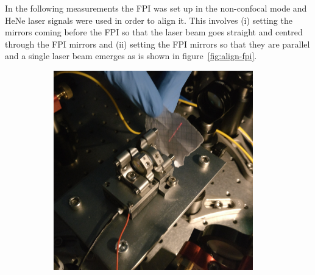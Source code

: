 In the following measurements the \ac{FPI} was set up in the non-confocal mode and HeNe laser signals were used in order to align it.
This involves (i) setting the mirrors coming before the \ac{FPI} so that the laser beam goes straight and centred through the \ac{FPI} mirrors and (ii) setting the \ac{FPI} mirrors so that they are parallel and a single laser beam emerges as is shown in figure~\ref{fig:align-fpi}.


\begin{figure}[H]
	\centering
	\begin{subfigure}[b]{0.48\textwidth}
		\centering
		\includegraphics[width=0.95\textwidth]{figures/fabry-perot/setup/confocal-setup-higher-modes-1}
		\caption{}
		\label{fig:confocal-setup-higher-modes-1}
	\end{subfigure}%
	~ %
	\begin{subfigure}[b]{0.48\textwidth}
		\centering

\end{subfigure}
\end{figure}
